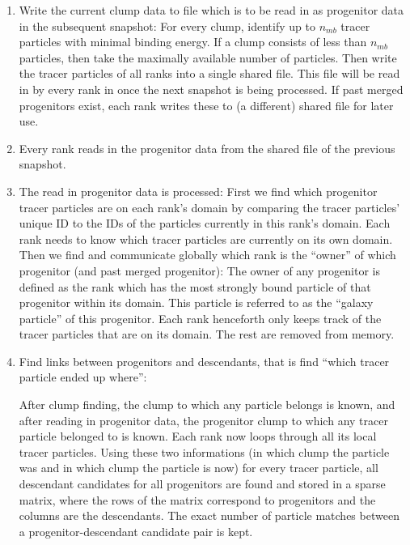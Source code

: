 \begin{enumerate}
%	
	\item Write the current clump data to file which is to be read in as progenitor data in the subsequent snapshot:
		For every clump, identify up to $n_{mb}$ tracer particles with minimal binding energy.
		If a clump consists of less than $n_{mb}$ particles, then take the maximally available number of particles.
		Then write the tracer particles of all ranks into a single shared file. 
		This file will be read in by every rank in once the next snapshot is being processed.
		If past merged progenitors exist, each rank writes these to (a different) shared file for later use.

%		
%	
	\item Every rank reads in the progenitor data from the shared file of the previous snapshot.
	
	\item The read in progenitor data is processed:
		First we find which progenitor tracer particles are on each rank's domain by comparing the tracer particles' unique ID to the IDs of the particles currently in this rank's domain.
		Each rank needs to know which tracer particles are currently on its own domain.	
		Then we find and communicate globally which rank is the ``owner'' of which progenitor (and past merged progenitor): 
		The owner of any progenitor is defined as the rank which has the most strongly bound particle of that progenitor within its domain.
		This particle is referred to as the ``galaxy particle'' of this progenitor.
		Each rank henceforth only keeps track of the tracer particles that are on its domain.
		The rest are removed from memory.

	
	\item Find links between progenitors and descendants, that is find ``which tracer particle ended up where'':
	
		After clump finding, the clump to which any particle belongs is known, and after reading in progenitor data, the progenitor clump 
		to which any tracer particle belonged to is known.
		Each rank now loops through all its local tracer particles.
		Using these two informations (in which clump the particle was and in which clump the particle is now) for every tracer particle, 
		all descendant candidates for all progenitors are found and stored in a sparse matrix, where the rows of the matrix correspond 
		to progenitors and the columns are the descendants.
		The exact number of particle matches between a progenitor-descendant candidate pair is kept.
		

\end{enumerate}
